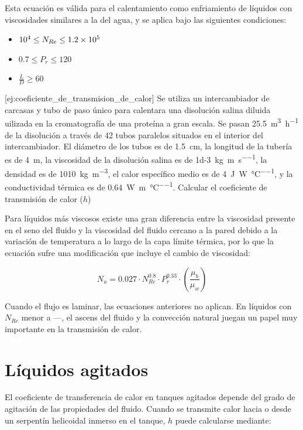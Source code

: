 \documentclass{AsignaturaResumen}
\begin{document}
Esta ecuación es válida para el calentamiento como enfriamiento de líquidos con viscosidades similares a la del agua, y se aplica bajo las siguientes condiciones:

\begin{itemize}
    \item $\num{d4}    \leq N_{Re} \leq \num{1.2d5}$
    \item $0.7         \leq P_{r}  \leq 120$
    \item $\frac{L}{D} \geq 60$
\end{itemize}

[ej:coeficiente_de_transmision_de_calor]{
    Se utiliza un intercambiador de carcasas y tubo de paso único para calentara una disolución salina diluida uilizada en la cromatografía de una proteína a gran escala. Se pasan \qty{25.5}{\m\cubed\per\hour} de la disolución a través de 42 tubos paralelos situados en el interior del intercambiador. El diámetro de los tubos es de \qty{1.5}{\cm}, la longitud de la tubería es de \qty{4}{\m}, la viscosidad de la disolución salina es de \qty{1d-3}{\kg\per\m\per\s}, la densidad es de \qty{1010}{\kg\per\m\cubed}, el calor específico medio es de \qty{4}{\J\per\watt\per\degreeCelsius}, y la conductividad térmica es de \qty{0.64}{\watt\per\m\per\degreeCelsius}. Calcular el coeficiente de transmisión de calor ($h$)
}

Para líquidos más viscosos existe una gran diferencia entre la viscosidad presente en el seno del fluido y la viscosidad del fluido cercano a la pared debido a la variación de temperatura a lo largo de la capa límite térmica, por lo que la ecuación sufre una modificación que incluye el cambio de viscosidad:

\begin{equation}
    N_{u} = 0.027 \cdot N_{Re}^{0.8} \cdot P_{r}^{0.33} \cdot (\frac{\mu_{b}}{\mu_{w}})
\end{equation}

Cuando el flujo es laminar, las ecuaciones anteriores no aplican. En líquidos con $N_{Re}$ menor a ---, el ascens del fluido y la convección natural juegan un papel muy importante en la transmisión de calor.

\section{Líquidos agitados}

El coeficiente de transferencia de calor en tanques agitados depende del grado de agitación de las propiedades del fluido. Cuando se transmite calor hacia o desde un serpentín helicoidal inmerso en el tanque, $h$ puede calcularse mediante:
\end{document}
